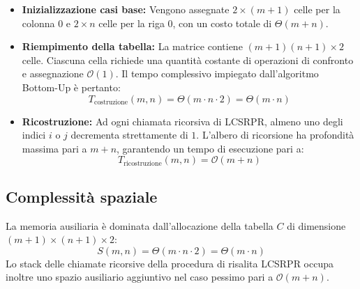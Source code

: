 \begin{itemize}
\item \textbf{Inizializzazione casi base:} Vengono assegnate $2 \times (m + 1)$ celle per la colonna $0$ e $2 \times n$ celle per la riga $0$, con un costo totale di $\Theta(m + n)$.
\item \textbf{Riempimento della tabella:} La matrice contiene $(m + 1)(n + 1) \times 2$ celle. Ciascuna cella richiede una quantità costante di operazioni di confronto e assegnazione $\mathcal{O}(1)$. Il tempo complessivo impiegato dall'algoritmo Bottom-Up è pertanto:
\begin{equation*}
T_{\text{costruzione}}(m, n) = \Theta(m \cdot n \cdot 2) = \Theta(m \cdot n)
\end{equation*}
\item \textbf{Ricostruzione:} Ad ogni chiamata ricorsiva di \textsc{LCSRPR}, almeno uno degli indici $i$ o $j$ decrementa strettamente di $1$. L'albero di ricorsione ha profondità massima pari a $m + n$, garantendo un tempo di esecuzione pari a:
\begin{equation*}
T_{\text{ricostruzione}}(m, n) = \mathcal{O}(m + n)
\end{equation*}
\end{itemize}\subsection{Complessità spaziale}
La memoria ausiliaria è dominata dall'allocazione della tabella $C$ di dimensione $(m + 1) \times (n + 1) \times 2$:
\begin{equation*}
S(m, n) = \Theta(m \cdot n \cdot 2) = \Theta(m \cdot n)
\end{equation*}
Lo stack delle chiamate ricorsive della procedura di risalita \textsc{LCSRPR} occupa inoltre uno spazio ausiliario aggiuntivo nel caso pessimo pari a $\mathcal{O}(m + n)$.